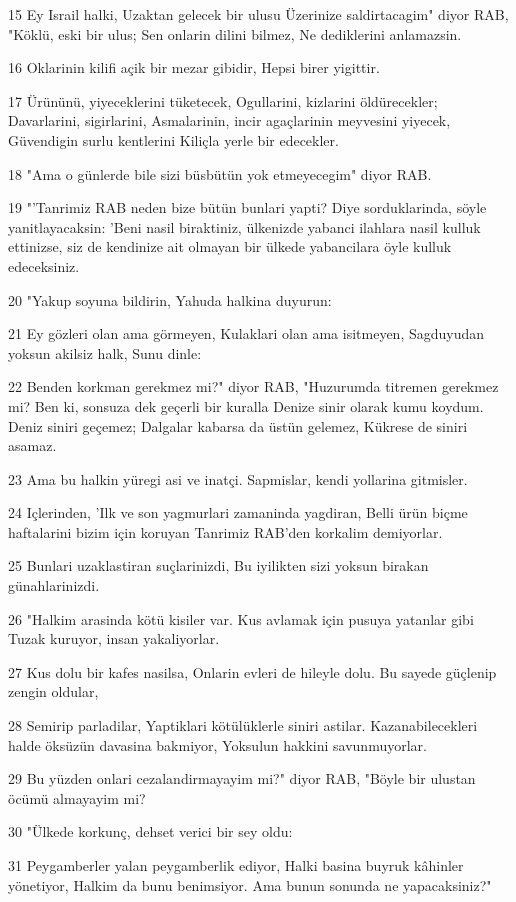\par 15 Ey Israil halki, Uzaktan gelecek bir ulusu Üzerinize saldirtacagim" diyor RAB, "Köklü, eski bir ulus; Sen onlarin dilini bilmez, Ne dediklerini anlamazsin.
\par 16 Oklarinin kilifi açik bir mezar gibidir, Hepsi birer yigittir.
\par 17 Ürününü, yiyeceklerini tüketecek, Ogullarini, kizlarini öldürecekler; Davarlarini, sigirlarini, Asmalarinin, incir agaçlarinin meyvesini yiyecek, Güvendigin surlu kentlerini Kiliçla yerle bir edecekler.
\par 18 "Ama o günlerde bile sizi büsbütün yok etmeyecegim" diyor RAB.
\par 19 "'Tanrimiz RAB neden bize bütün bunlari yapti? Diye sorduklarinda, söyle yanitlayacaksin: 'Beni nasil biraktiniz, ülkenizde yabanci ilahlara nasil kulluk ettinizse, siz de kendinize ait olmayan bir ülkede yabancilara öyle kulluk edeceksiniz.
\par 20 "Yakup soyuna bildirin, Yahuda halkina duyurun:
\par 21 Ey gözleri olan ama görmeyen, Kulaklari olan ama isitmeyen, Sagduyudan yoksun akilsiz halk, Sunu dinle:
\par 22 Benden korkman gerekmez mi?" diyor RAB, "Huzurumda titremen gerekmez mi? Ben ki, sonsuza dek geçerli bir kuralla Denize sinir olarak kumu koydum. Deniz siniri geçemez; Dalgalar kabarsa da üstün gelemez, Kükrese de siniri asamaz.
\par 23 Ama bu halkin yüregi asi ve inatçi. Sapmislar, kendi yollarina gitmisler.
\par 24 Içlerinden, 'Ilk ve son yagmurlari zamaninda yagdiran, Belli ürün biçme haftalarini bizim için koruyan Tanrimiz RAB'den korkalim demiyorlar.
\par 25 Bunlari uzaklastiran suçlarinizdi, Bu iyilikten sizi yoksun birakan günahlarinizdi.
\par 26 "Halkim arasinda kötü kisiler var. Kus avlamak için pusuya yatanlar gibi Tuzak kuruyor, insan yakaliyorlar.
\par 27 Kus dolu bir kafes nasilsa, Onlarin evleri de hileyle dolu. Bu sayede güçlenip zengin oldular,
\par 28 Semirip parladilar, Yaptiklari kötülüklerle siniri astilar. Kazanabilecekleri halde öksüzün davasina bakmiyor, Yoksulun hakkini savunmuyorlar.
\par 29 Bu yüzden onlari cezalandirmayayim mi?" diyor RAB, "Böyle bir ulustan öcümü almayayim mi?
\par 30 "Ülkede korkunç, dehset verici bir sey oldu:
\par 31 Peygamberler yalan peygamberlik ediyor, Halki basina buyruk kâhinler yönetiyor, Halkim da bunu benimsiyor. Ama bunun sonunda ne yapacaksiniz?"


